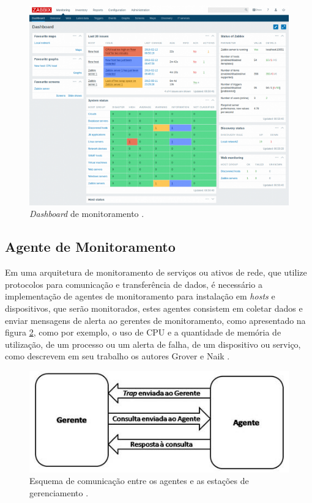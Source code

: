\begin{figure}[H]
	\begin{center}
	\includegraphics[scale = 0.80]{img/dashboard.png}
		\caption{\textit{Dashboard} de monitoramento \cite{zabbix}.}
		\label{fun:fig:zabbix}
	\end{center}
\end{figure}


\subsection{Agente de Monitoramento}

Em uma arquitetura de monitoramento de serviços ou ativos de rede, que utilize protocolos para comunicação e transferência de dados, é necessário a implementação de agentes de monitoramento para instalação em \textit{hosts} e dispositivos, que serão monitorados, estes agentes consistem em coletar dados e enviar mensagens de alerta ao gerentes de monitoramento, como  apresentado na figura \ref{fun:fig:agente}, como por exemplo, o uso de \acrshort{CPU} e a quantidade de memória de utilização, de um processo ou um alerta de falha, de um dispositivo ou serviço, como descrevem em seu trabalho os autores Grover e Naik \cite{7439952}.  

\begin{figure}[H]
	\begin{center}
	\includegraphics[scale = 0.80]{img/image004.jpg}
		\caption{Esquema de comunicação entre os agentes e as estações de gerenciamento \cite{snmpagentimage}.}
		\label{fun:fig:agente}
	\end{center}
\end{figure}

